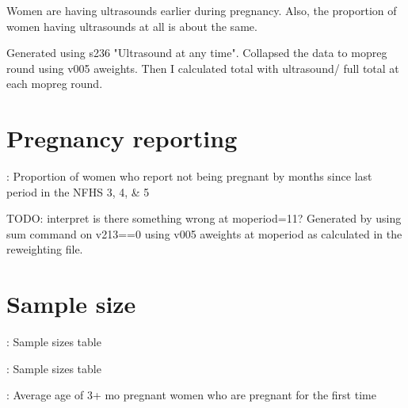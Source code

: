 \documentclass{article}
\begin{document}
Women are having ultrasounds earlier during pregnancy. Also, the proportion of women having ultrasounds at all is about the same.

Generated using s236 "Ultrasound at any time".
Collapsed the data to mopreg round using v005 aweights. 
Then I calculated total with ultrasound/ full total at each mopreg round.

\section{Pregnancy reporting}

\begin{table}[H]
    \centering
    \caption{: Proportion of women who report not being pregnant by months since last period in the NFHS 3, 4, \& 5}
    \label{tab:sumstat}
\end{table}


TODO: interpret 
is there something wrong at moperiod=11?
Generated by using sum command on v213==0 using v005 aweights at moperiod as calculated in the reweighting file. 


\section{Sample size}

\begin{table}[H]
    \centering
    \setlength{\tabcolsep}{4pt} %
    \footnotesize %
    \caption{: Sample sizes table}
    \label{tab:sumstat}
    \begin{adjustbox}{width=\textwidth}
        
    \end{adjustbox}
\end{table}


\begin{table}[H]
    \centering
    \setlength{\tabcolsep}{4pt} %
    \footnotesize %
    \caption{: Sample sizes table}
    \label{tab:sumstat}
    \begin{adjustbox}{width=\textwidth}
        
    \end{adjustbox}
\end{table}


\begin{table}[H]
    \centering
    \setlength{\tabcolsep}{4pt} %
    \footnotesize %
    \caption{: Average age of 3+ mo pregnant women who are pregnant for the first time}
    \label{tab:sumstat}
    \begin{adjustbox}{width=\textwidth}
        
    \end{adjustbox}
\end{table}
\end{document}
